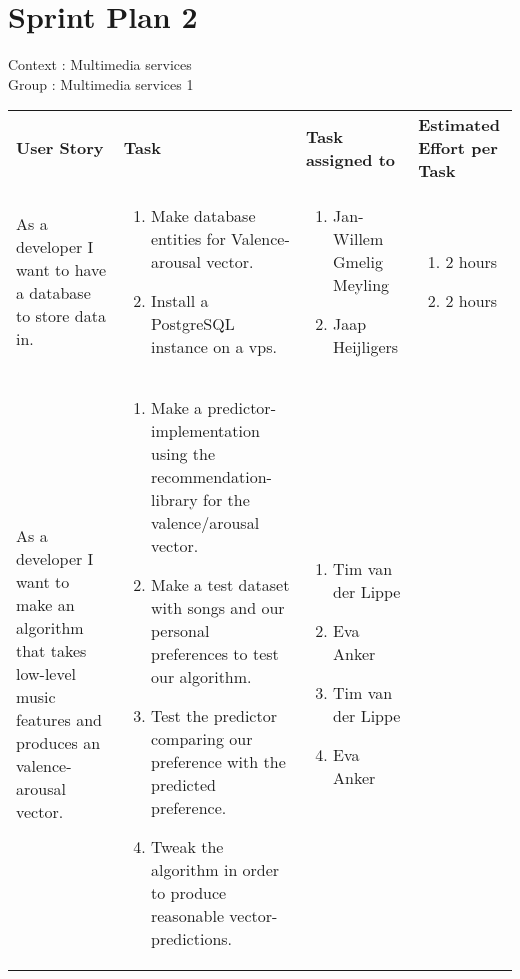\documentclass[11pt,a4paper]{article}
\begin{document}
\section*{Sprint Plan 2}
Context : Multimedia services\\
Group : Multimedia services 1\\



\begin{table}[h]
\begin{tabular}{|p{4.5cm}|p{7cm}|p{4cm}|p{2.6cm}|}
\textbf{User Story} & \textbf{Task} & \textbf{Task assigned to} & \textbf{Estimated Effort per Task} \\
As a developer I want to have a database to store data in.

&
\begin{enumerate}
\item Make database entities for Valence-arousal vector. 
\item Install a PostgreSQL instance on a vps.
\end{enumerate}

& 
\begin{enumerate}
\item Jan-Willem Gmelig Meyling
\item Jaap Heijligers
\end{enumerate}

& 
\begin{enumerate}
\item 2 hours
\item 2 hours
\end{enumerate}
\\

As a developer I want to make an algorithm that takes low-level music features and produces an valence-arousal vector.
&
\begin{enumerate}
\item Make a predictor-implementation using the recommendation-library for the valence/arousal vector.
\item Make a test dataset with songs and our personal preferences to test our algorithm.
\item Test the predictor comparing our preference with the predicted preference.
\item Tweak the algorithm in order to produce reasonable vector-predictions.
\end{enumerate}

&
\begin{enumerate}
\item Tim van der Lippe
\item Eva Anker
\item Tim van der Lippe
\item Eva Anker
\end{enumerate}


\end{tabular}
\end{table}
\end{document}
